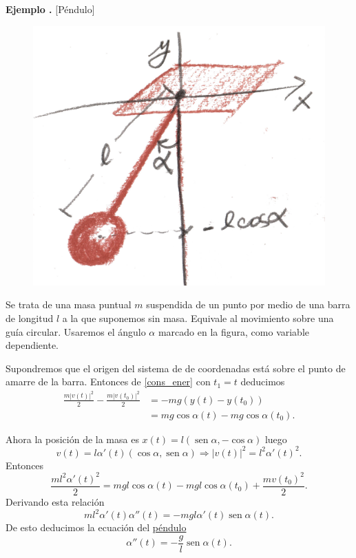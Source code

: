 \documentclass{article}
\DeclareMathOperator{\sen}{sen}
\newcounter{ejemplo_cont}
\newenvironment{ejemplo}{\noindent\textbf{Ejemplo  \arabic{ejemplo_cont}.} }{\addtocounter{ejemplo_cont}{1}}
\begin{document}
\begin{ejemplo}[Péndulo]
\end{ejemplo}


\begin{figure}
  \begin{center}
  \includegraphics[scale=.07]{imagenes/pendulo.jpg}
 \end{center}
\end{figure}
  Se trata de una masa puntual $m$ suspendida de un punto por medio de una barra de longitud $l$
 a la que suponemos sin masa. Equivale al movimiento sobre una guía circular.  Usaremos el ángulo $\alpha$ marcado en la figura, como variable dependiente.



Supondremos que el origen del sistema de de coordenadas está sobre el punto de amarre de la barra. Entonces de \eqref{cons_ener} con $t_1=t$ deducimos 
\[\begin{split}\frac{m|v(t)|^2}{2}-\frac{m|v(t_0)|^2}{2}&=-mg\left(y(t)-y(t_0)\right)\\
  &=mg\cos\alpha(t)-mg\cos\alpha(t_0).
   \end{split}
\]



Ahora la posición de la masa es $x(t)=l(\sen\alpha,-\cos\alpha)$ luego 
\[v(t)=l\alpha'(t)(\cos\alpha,\sen\alpha) \Longrightarrow |v(t)|^2=l^2\alpha'(t)^2.\]
Entonces
\[\frac{ml^2\alpha'(t)^2}{2}= mgl\cos\alpha(t)-mgl\cos\alpha(t_0) +\frac{mv(t_0)^2}{2}.\]
Derivando esta relación
\[ml^2\alpha'(t)\alpha''(t)=-mgl\alpha'(t)\sen\alpha(t).\]
De esto deducimos la ecuación del \href{http://es.wikipedia.org/wiki/Péndulo}{péndulo}
\[\boxed{\alpha''(t)=-\frac{g}{l}\sen\alpha(t)}.\]
\end{document}
